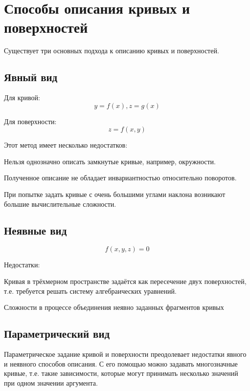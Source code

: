 \documentclass{bmstu}
\newenvironment{gost-itemize}
{\begin{itemize}[label=---,itemindent=\parindent,leftmargin=0pt]}
	{\end{itemize}}
\begin{document}
\section{Способы описания кривых и поверхностей}
Существует три основных подхода к описанию кривых и поверхностей.
\subsection{Явный вид}

Для кривой:
\begin{equation*}
    y=f(x), z = g(x)
\end{equation*}

Для поверхности:
\begin{equation*}
    z = f(x, y)
\end{equation*}

Этот метод имеет несколько недостатков:
\begin{gost-itemize}
    \item Нельзя однозначно описать замкнутые кривые, например, окружности.
    \item Полученное описание не обладает инвариантностью относительно поворотов.
    \item При попытке задать кривые с очень большими углами наклона возникают большие вычислительные сложности.
\end{gost-itemize}
\subsection{Неявные вид}

\begin{equation*}
    f(x,y,z) = 0
\end{equation*}

Недостатки:
\begin{gost-itemize}
    \item Кривая в трёхмерном пространстве задаётся как пересечение двух поверхностей, т.е. требуется решать систему алгебраических уравнений.
    \item Сложности в процессе объединения неявно заданных фрагментов кривых
\end{gost-itemize}

\subsection{Параметрический вид}

Параметрическое  задание кривой и поверхности преодолевает недостатки явного и неявного способов описания. С его помощью можно задавать многозначные кривые, т.е. такие зависимости, которые могут принимать несколько значений при одном значении аргумента.
\end{document}
